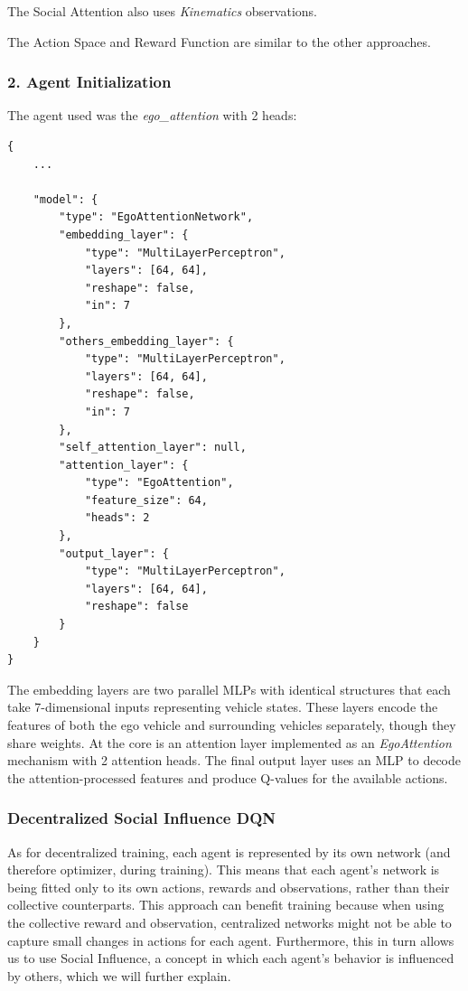 The Social Attention also uses \textit{Kinematics} observations.

The Action Space and Reward Function are similar to the other approaches. 
    

\subsubsection{2. Agent Initialization}

The agent used was the \textit{ego\_attention} with 2 heads:

 \begin{lstlisting}[style=json]
{
    ...
    
    "model": {
        "type": "EgoAttentionNetwork",
        "embedding_layer": {
            "type": "MultiLayerPerceptron",
            "layers": [64, 64],
            "reshape": false,
            "in": 7
        },
        "others_embedding_layer": {
            "type": "MultiLayerPerceptron",
            "layers": [64, 64],
            "reshape": false,
            "in": 7
        },
        "self_attention_layer": null,
        "attention_layer": {
            "type": "EgoAttention",
            "feature_size": 64,
            "heads": 2
        },
        "output_layer": {
            "type": "MultiLayerPerceptron",
            "layers": [64, 64],
            "reshape": false
        }
    }
}
\end{lstlisting}

The embedding layers are two parallel MLPs with identical structures that each take 7-dimensional inputs representing vehicle states. These layers encode the features of both the ego vehicle and surrounding vehicles separately, though they share weights.
At the core is an attention layer implemented as an \textit{EgoAttention} mechanism with 2 attention heads.
The final output layer uses an MLP to decode the attention-processed features and produce Q-values for the available actions.

\subsubsection{Decentralized Social Influence DQN}

As for decentralized training, each agent is represented by its own network (and therefore optimizer, during training). This means that each agent's network is being fitted only to its own actions, rewards and observations, rather than their collective counterparts. This approach can benefit training because when using the collective reward and observation, centralized networks might not be able to capture small changes in actions for each agent. Furthermore, this in turn allows us to use Social Influence, a concept in which each agent's behavior is influenced by others, which we will further explain. 

